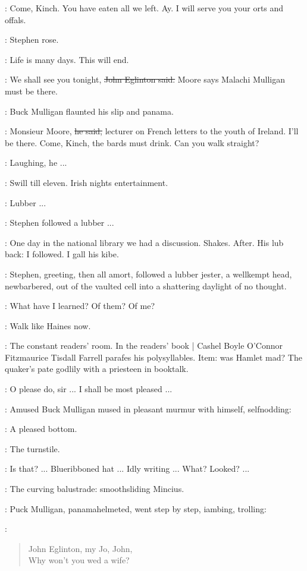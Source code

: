 \StephenInt:
Come, Kinch.
You have eaten all we left.
Ay.
I will serve you your orts and offals.

:
Stephen rose.

\StephenInt:
Life is many days.
This will end.

\eglinton:
We shall see you tonight,
\sout{John Eglinton said.}
 Moore says Malachi Mulligan must be there.

:
Buck Mulligan flaunted his slip and panama.

\mulligan:
Monsieur Moore,
\sout{he said,}
lecturer on French letters to the youth of Ireland.
I'll be there.
Come, Kinch,
the bards must drink.
Can you walk straight?

:
Laughing, he ...

\StephenInt:
Swill till eleven.
Irish nights entertainment.

\StephenInt:
Lubber ...

\StephenInt:
Stephen followed a lubber ...

\StephenInt:
One day in the national library we had a discussion.
Shakes.
After.
His lub back:
I followed.
I gall his kibe.

:
Stephen,
greeting,
then all amort,
followed
a lubber jester,
a wellkempt head,
newbarbered,
out of the vaulted cell
into a shattering daylight of no thought.

\StephenInt:
What have I learned?
Of them?
Of me?

\StephenInt:
Walk like Haines now.

\StephenInt:
The constant readers' room.
In the readers' book |
Cashel Boyle O'Connor Fitzmaurice Tisdall Farrell parafes his polysyllables.
Item: was Hamlet mad?
The quaker's pate godlily with a priesteen in booktalk.

\librarian:
O please do, sir ...
I shall be most pleased ...

:
Amused Buck Mulligan mused in pleasant murmur with himself,
selfnodding:

\mulligan:
A pleased bottom.

\StephenInt:
The turnstile.

\StephenInt:
Is that? ...
Blueribboned hat ...
Idly writing ...
What?
Looked? ...

\StephenInt:
The curving balustrade:
smoothsliding Mincius.

:
Puck Mulligan,
panamahelmeted,
went step by step,
iambing,
trolling:

\mulligan:
\begin{verse}
    John Eglinton, my Jo, John, \\
    Why won't you wed a wife?
\end{verse}

